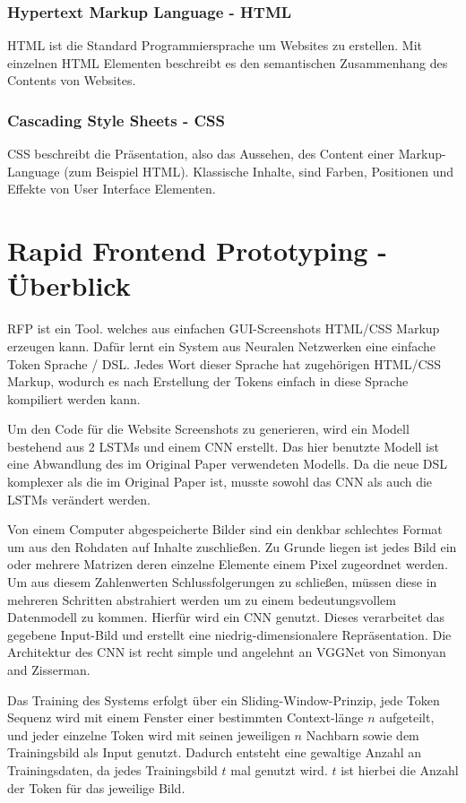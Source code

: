 \documentclass[pdftex,a4paper,halfparskip]{scrartcl}
\begin{document}
\subsubsection{Hypertext Markup Language - HTML}
HTML ist die Standard Programmiersprache um Websites zu erstellen. Mit einzelnen HTML Elementen beschreibt es den semantischen Zusammenhang des Contents von Websites.

\subsubsection{Cascading Style Sheets - CSS}
CSS beschreibt die Präsentation, also das Aussehen, des Content einer Markup-Language (zum Beispiel HTML). Klassische Inhalte, sind Farben, Positionen und Effekte von User Interface Elementen.
 

\section{Rapid Frontend Prototyping - Überblick}

RFP ist ein Tool. welches aus einfachen GUI-Screenshots HTML/CSS Markup erzeugen kann. Dafür lernt ein System aus Neuralen Netzwerken eine einfache Token Sprache / DSL. Jedes Wort dieser Sprache hat zugehörigen HTML/CSS Markup, wodurch es nach Erstellung der Tokens einfach in diese Sprache kompiliert werden kann.

Um den Code für die Website Screenshots zu generieren, wird ein Modell bestehend aus 2 LSTMs und einem CNN erstellt. Das hier benutzte Modell ist eine Abwandlung des im Original Paper verwendeten Modells. Da die neue DSL komplexer als die im Original Paper ist, musste sowohl das CNN als auch die LSTMs verändert werden. 

Von einem Computer abgespeicherte Bilder sind ein denkbar schlechtes Format um aus den Rohdaten auf Inhalte zuschließen. Zu Grunde liegen ist jedes Bild ein oder mehrere Matrizen deren einzelne Elemente einem Pixel zugeordnet werden. Um aus diesem Zahlenwerten Schlussfolgerungen zu schließen, müssen diese in mehreren Schritten abstrahiert werden um zu einem bedeutungsvollem Datenmodell zu kommen. Hierfür wird ein CNN genutzt. Dieses verarbeitet das gegebene Input-Bild und erstellt eine niedrig-dimensionalere Repräsentation. Die Architektur des CNN ist recht simple und angelehnt an VGGNet von Simonyan and Zisserman. 

Das Training des Systems erfolgt über ein Sliding-Window-Prinzip, jede Token Sequenz wird mit einem Fenster einer bestimmten Context-länge $n$ aufgeteilt, und jeder einzelne Token wird mit seinen jeweiligen $n$ Nachbarn sowie dem Trainingsbild als Input genutzt. Dadurch entsteht eine gewaltige Anzahl an Trainingsdaten, da jedes Trainingsbild $t$ mal genutzt wird. $t$ ist hierbei die Anzahl der Token für das jeweilige Bild. 
\end{document}
